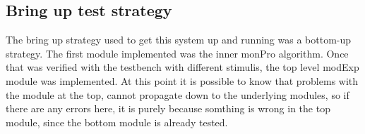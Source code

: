 \subsection{Bring up test strategy}
The bring up strategy used to get this system up and running was a bottom-up strategy. The first module
implemented was the inner monPro algorithm. Once that was verified with the testbench with different
stimulis, the top level modExp module was implemented. At this point it is possible to know that
problems with the module at the top, cannot propagate down to the underlying modules, so if there are
any errors here, it is purely because somthing is wrong in the top module, since the bottom module is
already tested.
